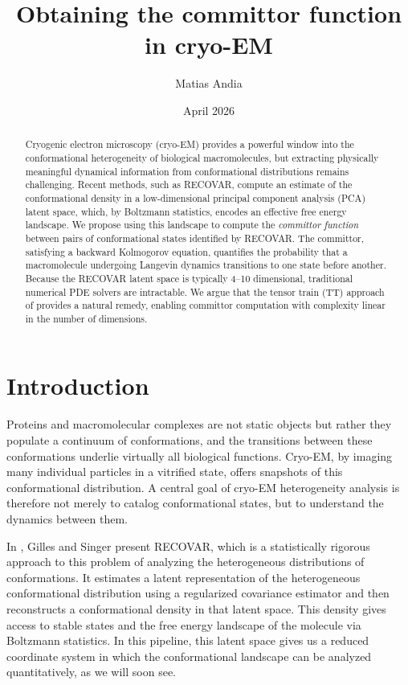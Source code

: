 \documentclass[11pt]{amsart}
\title{Obtaining the committor function in cryo-EM}
\author{Matias Andia}
\date{April 2026}
\begin{document}
\begin{abstract}
    Cryogenic electron microscopy (cryo-EM) provides a powerful window into the conformational heterogeneity of biological macromolecules, but extracting physically meaningful dynamical information from conformational distributions remains challenging. Recent methods, such as RECOVAR, compute an estimate of the conformational density in a low-dimensional principal component analysis (PCA) latent space, which, by Boltzmann statistics, encodes an effective free energy landscape. We propose using this landscape to compute the \emph{committor function} between pairs of conformational states identified by RECOVAR. The committor, satisfying a backward Kolmogorov equation, quantifies the probability that a macromolecule undergoing Langevin dynamics transitions to one state before another. Because the RECOVAR latent space is typically 4–10 dimensional, traditional numerical PDE solvers are intractable. We argue that the tensor train (TT) approach of \cite{committor} provides a natural remedy, enabling committor computation with complexity linear in the number of dimensions.
\end{abstract}

\maketitle

\section{Introduction}
Proteins and macromolecular complexes are not static objects but rather they populate a continuum of conformations, and the transitions between these conformations underlie virtually all biological functions. Cryo-EM, by imaging many individual particles in a vitrified state, offers snapshots of this conformational distribution. A central goal of cryo-EM heterogeneity analysis is therefore not merely to catalog conformational states, but to understand the dynamics between them.

In \cite{recovar}, Gilles and Singer present RECOVAR, which is a statistically rigorous approach to this problem of analyzing the heterogeneous distributions of conformations. It estimates a latent representation of the heterogeneous conformational distribution using a regularized covariance estimator and then reconstructs a conformational density in that latent space. This density gives access to stable states and the free energy landscape of the molecule via Boltzmann statistics. In this pipeline, this latent space gives us a reduced coordinate system in which the conformational landscape can be analyzed quantitatively, as we will soon see. 
 
\end{document}

